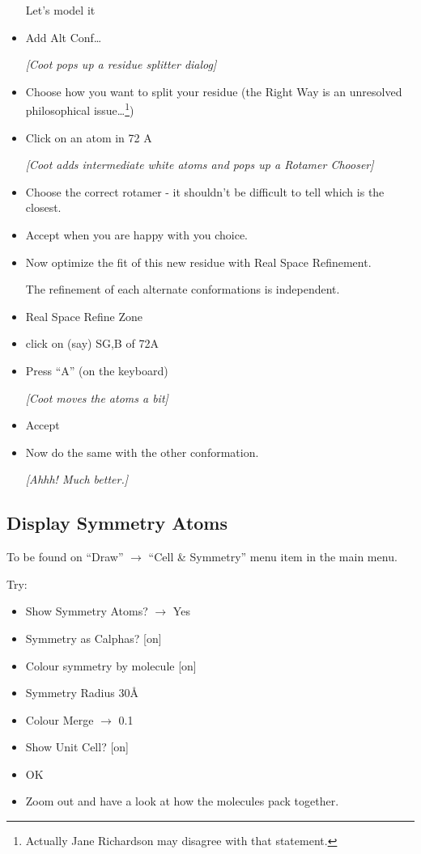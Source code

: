 \documentclass{article}
\begin{document}
\begin{itemize}
Let's model it

\item \textsf{Add Alt Conf\ldots}

\textsl{  [Coot pops up a residue splitter dialog]}

\item Choose how you want to split your residue (the Right Way is an
  unresolved philosophical issue\ldots\footnote{Actually Jane Richardson may disagree with that statement.})

\item Click on an atom in 72 A
  
  \textsl{ [Coot adds intermediate white atoms and pops up a Rotamer
    Chooser]}
  
\item Choose the correct rotamer - it shouldn't be difficult to tell
  which is the closest.

\item \textsf{Accept} when you are happy with you choice.
  
\item Now optimize the fit of this new residue with Real Space
  Refinement.

The refinement of each alternate conformations is independent.

\item \textsf{Real Space Refine Zone}

\item click on (say) SG,B of 72A

\item Press ``A'' (on the keyboard)

  \textsl{ [Coot moves the atoms a bit]}

\item \textsf{Accept}

\item Now do the same with the other conformation.

   \emph{  [Ahhh!  Much better.]}

\end{itemize}


\subsection{Display Symmetry Atoms}
To be found on \textsf{``Draw'' $\rightarrow$ ``Cell \& Symmetry''}
menu item in the main menu.

Try:
\begin{itemize}
\item \textsf{Show Symmetry Atoms? $\rightarrow$ Yes}
\item \textsf{Symmetry as Calphas?} [on]
\item \textsf{Colour symmetry by molecule} [on]
\item \textsf{Symmetry Radius 30\AA}
\item \textsf{Colour Merge $\rightarrow$ 0.1}
\item \textsf{Show Unit Cell?} [on]
\item \textsf{OK}
\item Zoom out and have a look at how the molecules pack together.
\end{itemize}
\end{document}
